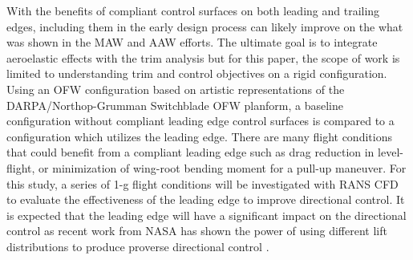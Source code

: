 With the benefits of compliant control surfaces on both leading and trailing edges, including them in the early design process can likely improve on the what was shown in the MAW and AAW efforts.
The ultimate goal is to integrate aeroelastic effects with the trim analysis but for this paper, the scope of work is limited to understanding trim and control objectives on a rigid configuration.
Using an OFW configuration based on artistic representations of the DARPA/Northop-Grumman Switchblade OFW planform, a baseline configuration without compliant leading edge control surfaces is compared to a configuration which utilizes the leading edge.
There are many flight conditions that could benefit from a compliant leading edge such as drag reduction in level-flight, or minimization of wing-root bending moment for a pull-up maneuver.
For this study, a series of 1-g flight conditions will be investigated with RANS CFD to evaluate the effectiveness of the leading edge to improve directional control.
It is expected that the leading edge will have a significant impact on the directional control as recent work from NASA has shown the power of using different lift distributions to produce proverse directional control \cite{bowers2016wings}.
